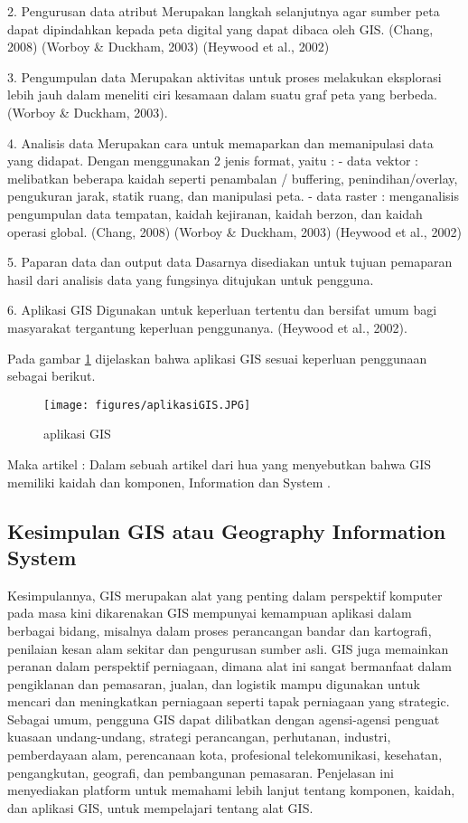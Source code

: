2. Pengurusan data atribut
Merupakan langkah selanjutnya agar sumber peta dapat dipindahkan kepada peta digital yang dapat dibaca oleh GIS.
(Chang, 2008) (Worboy \& Duckham, 2003) (Heywood et al., 2002)

3. Pengumpulan data
Merupakan aktivitas untuk proses melakukan eksplorasi lebih jauh dalam meneliti ciri kesamaan dalam suatu graf peta yang berbeda. (Worboy \& Duckham, 2003).

4. Analisis data
Merupakan cara untuk memaparkan dan memanipulasi data yang didapat. Dengan menggunakan 2 jenis format, yaitu :
- data vektor : melibatkan beberapa kaidah seperti penambalan / buffering, penindihan/overlay, pengukuran jarak, statik ruang, dan manipulasi peta.
- data raster : menganalisis pengumpulan data tempatan, kaidah kejiranan, kaidah berzon, dan kaidah operasi global.
(Chang, 2008) (Worboy \& Duckham, 2003) (Heywood et al., 2002)

5. Paparan data dan output data
Dasarnya disediakan untuk tujuan pemaparan hasil dari analisis data yang fungsinya ditujukan untuk pengguna.

6. Aplikasi GIS
Digunakan untuk keperluan tertentu dan bersifat umum bagi masyarakat tergantung keperluan penggunanya. 
(Heywood et al., 2002).

Pada gambar \ref{aplikasi GIS} dijelaskan bahwa aplikasi GIS sesuai keperluan penggunaan sebagai berikut.
\begin{figure}[ht]
	\centerline{\texttt{[image: figures/aplikasiGIS.JPG]}}
	\caption{aplikasi GIS}
	\label{aplikasi GIS}
	\end{figure}
Maka artikel :
	Dalam sebuah artikel dari hua yang menyebutkan bahwa  GIS memiliki kaidah dan komponen, Information dan System \cite{hua2017sistem}.

\subsection{Kesimpulan GIS atau Geography Information System}
Kesimpulannya, GIS merupakan alat yang penting dalam perspektif komputer pada masa kini dikarenakan GIS
mempunyai kemampuan aplikasi dalam berbagai bidang, misalnya dalam proses perancangan bandar dan kartografi,
penilaian kesan alam sekitar dan pengurusan sumber asli. GIS juga memainkan peranan dalam perspektif perniagaan,
dimana alat ini sangat bermanfaat dalam pengiklanan dan pemasaran, jualan, dan logistik 
mampu digunakan untuk mencari dan meningkatkan perniagaan seperti tapak perniagaan yang strategic. Sebagai umum, pengguna GIS dapat dilibatkan dengan agensi-agensi penguat kuasaan undang-undang, strategi
perancangan, perhutanan, industri, pemberdayaan alam, perencanaan kota, profesional
telekomunikasi, kesehatan, pengangkutan, geografi, dan pembangunan pemasaran. 
Penjelasan ini menyediakan platform untuk memahami lebih lanjut tentang komponen, kaidah, dan aplikasi GIS, 
untuk mempelajari tentang alat GIS.
